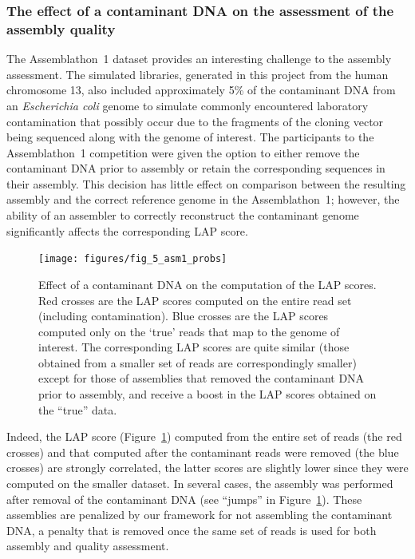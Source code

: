 \documentclass[12pt,\mydriver]{thesis}
\begin{document}
\subsubsection{The effect of a contaminant DNA on the assessment of
  the assembly quality}
The Assemblathon~1 dataset provides an interesting challenge to the
assembly assessment.  The simulated libraries, generated in this
project from the human chromosome 13, also included approximately 5\%
of the contaminant DNA from an \emph{Escherichia coli} genome to
simulate commonly encountered laboratory contamination that possibly occur due to
the fragments of the cloning vector being sequenced along with the genome
of interest.  The participants to the Assemblathon~1 competition were
given the option to either remove the contaminant DNA prior to
assembly or retain the corresponding sequences in their assembly.
This decision has little effect on comparison between the resulting assembly
and the correct reference genome in the Assemblathon~1;
however, the ability of an assembler to correctly reconstruct the
contaminant genome significantly affects the corresponding LAP
score.

\begin{figure}[ht!]
\begin{center}
 \texttt{[image: figures/fig\_5\_asm1\_probs]}
\end{center}
\renewcommand{\baselinestretch}{1}
\small\normalsize
\begin{quote}
\caption[Effect of a contaminant DNA on the computation of the LAP
    scores.]{Effect of a contaminant DNA on the computation of the LAP
    scores. Red crosses are the LAP scores computed on the entire read
    set (including contamination). Blue crosses are the LAP scores computed only on
    the `true' reads that map to the genome of interest. The
    corresponding LAP scores are quite similar (those obtained from a
    smaller set of reads are correspondingly smaller) except for those of assemblies that removed the contaminant DNA prior
    to assembly, and receive a boost in the LAP scores obtained on the ``true'' data.}
\label{fig:asm1_probs}
\end{quote}
\end{figure}
\renewcommand{\baselinestretch}{2}
\small\normalsize

Indeed, the LAP score (Figure~\ref{fig:asm1_probs})
computed from the entire set of reads (the red crosses) and that computed
after the contaminant reads were removed (the blue crosses) are strongly
correlated, the latter scores are slightly lower since they were computed on the smaller dataset.  In several cases, the assembly was performed
after removal of the contaminant DNA (see ``jumps'' in Figure~\ref{fig:asm1_probs}).  These
assemblies are penalized by our framework for not assembling the
contaminant DNA, a penalty that is removed once the same set of reads is
used for both assembly and quality assessment.
\end{document}
